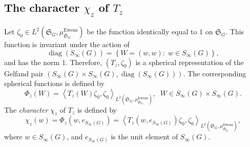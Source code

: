 \documentclass[12pt]{amsart}
\theoremstyle{definition}
\numberwithin{equation}{section}
\DeclareMathOperator{\diag}{diag}
\DeclareMathOperator{\Ewens}{Ewens}
\begin{document}
\subsection{The character $\chi_{z}$ of $T_z$}\label{Section12.4}
Let $\zeta_0\in L^2\left(\mathfrak{S}_G,\mu^{\Ewens}_{\mathfrak{S}_G}\right)$
be the function identically equal  to $1$ on $\mathfrak{S}_G$. This function is invariant under the action of
$$
\diag\left(S_{\infty}(G)\right)=\left\{W=(w,w):\;w\in S_{\infty}(G)\right\},
$$
and has the norm $1$. Therefore, $\left(T_z,\zeta_0\right)$ is a spherical representation of the Gelfand pair $\left(S_{\infty}(G)\times S_{\infty}(G),\diag\left(S_{\infty}\left(G\right)\right)\right)$. The corresponding spherical functions is defined by
\begin{equation}\label{12.4.1}
\Phi_z(W)=\left<T_z(W)\zeta_0,\zeta_0\right>_{L^2\left(\mathfrak{S}_G,\mu_{\mathfrak{S}_G}^{\Ewens}\right)},\;\; W\in S_{\infty}(G)\times S_{\infty}(G).
\end{equation}
The \textit{character} $\chi_z$ of $T_z$ is defined by
\begin{equation}\label{12.4.2}
\chi_z(w)=\Phi_z\left(w,e_{S_{\infty}(G)}\right)=
\left<T_z\left(w,e_{S_{\infty}(G)}\right)\zeta_0,\zeta_0\right>_{L^2\left(\mathfrak{S}_G,\mu_{\mathfrak{S}_G}^{\Ewens}\right)},
\end{equation}
where $w\in S_{\infty}(G)$, and $e_{S_{\infty}(G)}$ is the unit element
of $S_{\infty}(G)$.
\end{document}
